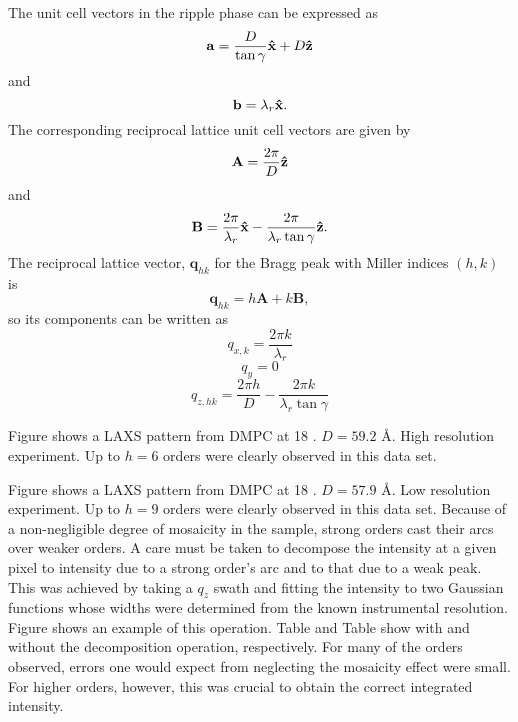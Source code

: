 \documentclass[12pt,letterpaper]{article}
\begin{document}
The unit cell vectors in the ripple phase can be expressed as 
\begin{equation}
  \mathbf{a} = \frac{D}{\tan\gamma}\mathbf{\hat{x}} + D\mathbf{\hat{z}}
\end{equation}
and
\begin{equation}
  \mathbf{b} = \lambda_r\mathbf{\hat{x}}.
\end{equation}
The corresponding reciprocal lattice unit cell vectors are given by
\begin{equation}
  \mathbf{A} = \frac{2\pi}{D}\mathbf{\hat{z}}
\end{equation}
and
\begin{equation}
  \mathbf{B} = \frac{2\pi}{\lambda_r}\mathbf{\hat{x}} - \frac{2\pi}{\lambda_r\tan\gamma}\mathbf{\hat{z}}.
\end{equation}
The reciprocal lattice vector, $\mathbf{q}_{hk}$ for the Bragg peak with 
Miller indices $(h,k)$ is 
\begin{equation}
  \mathbf{q}_{hk}=h\mathbf{A}+k\mathbf{B},
\end{equation}
so its components can be written as
\begin{equation}
  q_{x,k} = \frac{2\pi k}{\lambda_r}
\end{equation}
\begin{equation}
  q_y = 0
\end{equation}
\begin{equation}
  q_{z,hk} = \frac{2\pi h}{D} - \frac{2\pi k}{\lambda_r\tan\gamma}
\end{equation}

Figure shows a LAXS pattern from DMPC at 18 \degC. $D=59.2$ \AA. High 
resolution experiment. Up to $h=6$ orders were clearly observed in this
data set. 

Figure shows a LAXS pattern from DMPC at 18 \degC. $D=57.9$ \AA. Low
resolution experiment. Up to $h=9$ orders were clearly observed in this
data set. Because of a non-negligible degree of mosaicity in the sample,
strong orders cast their arcs over weaker orders. A care must be 
taken to decompose the intensity at a given pixel to intensity due to
a strong order's arc and to that due to a weak peak. This was achieved
by taking a $q_z$ swath and fitting the intensity to two Gaussian
functions whose widths were determined from the known instrumental 
resolution. Figure shows an example of this operation. Table and
Table show with and without the decomposition operation, respectively. 
For many of the orders observed, errors one would expect from 
neglecting the mosaicity effect were small. For higher orders, however,
this was crucial to obtain the correct integrated intensity.
\end{document}
